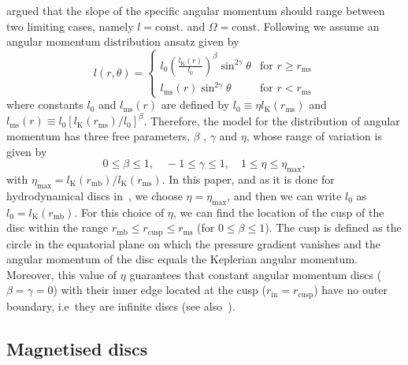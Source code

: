 \documentclass{aa}
\begin{document}
\cite{Jaroszynski:1980} argued that the slope of the specific angular momentum should range between two limiting cases, namely $l = \mathrm{const.}$ and $\Omega = \mathrm{const}$. Following \citet{Qian:2009} we assume an angular momentum distribution ansatz given by  
\begin{equation}
l (r,\theta) = \left\{ \label{eq:ansatz} 
  \begin{array}{lr}
    l_0 \left(\frac{l_{\mathrm{K}}(r)}{l_0}\right)^{\beta}\sin^{2\gamma}{\theta} &  \text{for } r \geq r_{\mathrm{ms}}\\
    l_{\mathrm{ms}}(r)\sin^{2\gamma}{\theta} & \text{for } r < r_{\mathrm{ms}}
  \end{array}
\right.
\end{equation}
where constants $l_0$ and $l_{\mathrm{ms}}(r)$ are defined by $l_0 \equiv \eta l_{\mathrm{K}}(r_{\mathrm{ms}})$ and $l_{\mathrm{ms}}(r) \equiv l_0 [l_{\mathrm{K}}(r_{\mathrm{ms}})/l_0]^{\beta}$. Therefore, the model for the distribution of angular momentum has three free parameters, $\beta$ , $\gamma$ and $\eta$, whose range of variation is given by~\citep{Qian:2009}
\begin{equation}
0 \leq \beta \leq 1, \quad -1 \leq \gamma \leq 1, \quad 1 \leq \eta \leq \eta_{\mathrm{max}},
\end{equation}
with $\eta_{\mathrm{max}} = l_{\mathrm{K}}(r_{\mathrm{mb}})/l_{\mathrm{K}}(r_{\mathrm{ms}})$. In this paper, and as it is done for hydrodynamical discs in~\citet{Qian:2009}, we choose $\eta = \eta_{\mathrm{max}}$, and then we can write $l_0$ as $l_0 = l_{\mathrm{K}}(r_{\mathrm{mb}})$. For this choice of $\eta$, we can find the location of the cusp of the disc  within the range $r_{\mathrm{mb}} \leq r_{\mathrm{cusp}} \leq r_{\mathrm{ms}}$ (for $0 \leq \beta \leq 1$). The cusp is defined as the circle in the equatorial plane on which the pressure gradient vanishes and the angular momentum of the disc equals the Keplerian angular momentum. Moreover, this value of $\eta$ guarantees that constant angular momentum discs ($\beta = \gamma = 0$) with their inner edge located at the cusp ($r_{\mathrm{in}} = r_{\mathrm{cusp}}$) have no outer boundary, i.e~they are infinite discs (see also~\cite{Font:2002}). 

\subsection{Magnetised discs}
\end{document}
